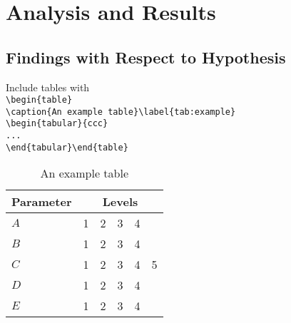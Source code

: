 \chapter{Analysis and Results}\label{chapter:Results}

\section{Findings with Respect to Hypothesis}

Include tables with\\
\verb+\begin{table}+\\
\verb+\caption{An example table}\label{tab:example}+\\
\verb+\begin{tabular}{ccc}+\\
\verb+...+\\
\verb+\end{tabular}\end{table}+

\begin{table}[h]
\centering
\caption{An example table}\label{tab:example}
\begin{tabular}{lccccc}
\toprule
Parameter&\multicolumn{5}{c}{Levels}\\
\midrule
$A$&1&2&3&4&\\
$B$&1&2&3&4&\\
$C$&1&2&3&4&5\\
\midrule
$D$&1&2&3&4&\\
$E$&1&2&3&4&\\
\bottomrule
\end{tabular}
\end{table}